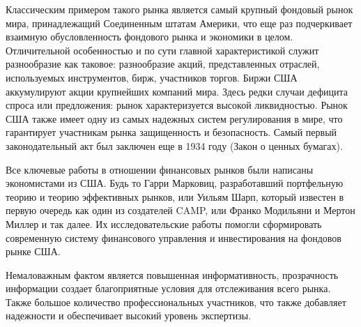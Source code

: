 Классическим примером такого рынка является самый крупный фондовый рынок мира, принадлежащий Соединенным штатам Америки, что еще раз подчеркивает взаимную обусловленность фондового рынка и экономики в целом. Отличительной особенностью и по сути главной характеристикой служит разнообразие как таковое: разнообразие акций, представленных отраслей, используемых инструментов, бирж, участников торгов. Биржи США аккумулируют акции крупнейших компаний мира. Здесь редки случаи дефицита спроса или предложения: рынок характеризуется высокой ликвидностью. Рынок США также имеет одну из самых надежных систем регулирования в мире, что гарантирует участникам рынка защищенность и безопасность. Самый первый законодательный акт был заключен еще в 1934 году (Закон о ценных бумагах).

Все ключевые работы в отношении финансовых рынков были написаны экономистами из США. Будь то Гарри Марковиц, разработавший портфельную теорию и теорию эффективных рынков, или Уильям Шарп, который известен в первую очередь как один из создателей CAMP, или Франко Модильяни и Мертон Миллер и так далее. Их исследовательские работы помогли сформировать современную систему финансового управления и инвестирования на фондовов рынке США. 

Немаловажным фактом является повышенная информативность, прозрачность информации создает благоприятные условия для отслеживания всего рынка. Также большое количество профессиональных участников, что также добавляет надежности и обеспечивает высокий уровень экспертизы. 

